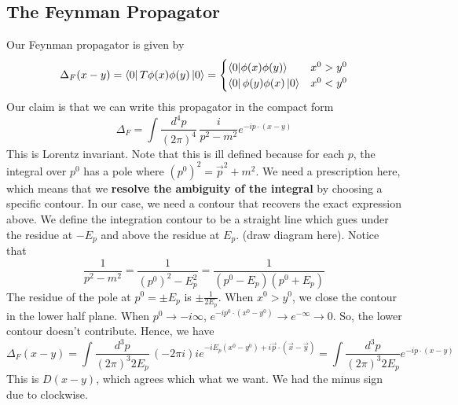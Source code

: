 \documentclass[11pt, oneside]{article}   	%
\theoremstyle{newline}
\theoremstyle{newline}
\theoremstyle{newline}
\theoremstyle{newline}
\theoremstyle{newline}
\begin{document}
\subsection{The Feynman Propagator} 
Our Feynman propagator is given by 
\[
\Delta_F( x - y )  = \bra{0}T \phi ( x) \phi( y ) \ket{0}  = \begin{cases}
\braket{0}{\phi ( x) \phi( y )} & x^{ 0 } > y^ 0 \\
\bra{0}\phi(y)\phi(x)\ket{0} & x^ 0 < y^0  
\end{cases}
\] Our claim is that we can write this propagator in the compact form 
\[
\Delta_F = \int \frac{d^4 p }{( 2 \pi )^4 } \, \frac{i }{p^2  - m^2 }e^{  - i p \cdot  ( x - y ) }
\] This is Lorentz invariant. Note that this is ill defined 
because for each $p $, the integral over $p^0 $ has 
a pole where $ ( p^0 )^2 = \vec{p}^2 + m^2 $. We need a prescription here, which means that we \textbf{resolve the ambiguity of the integral} by choosing a specific contour. 
In our case, we need a contour that recovers the exact expression above. 
We define the integration contour to be a straight line which gues under the residue at $ - E_p$ and above the residue at $ E_ p $.  
(draw diagram here). Notice that 
\[
\frac{1}{ p^2  - m^2 } = \frac{1}{ ( p^0)^ 2 - E_p^2}  = \frac{1}{( p^0 - E_p )(p^0 + E_p ) }
\] The residue of the pole at $ p^0 = \pm E_p $ is $ \pm \frac{1}{2 E_p}$. 
When $ x^ 0 > y ^0 $, we close the contour in the 
lower half plane. When $ p^0 \to  - i \infty $, $e^{  -i p^0 \cdot ( x^ 0 - y ^ 0 )} \to e^{  - \infty} \to 0 $. So, the lower contour doesn't 
contribute.  Hence, we have
\[
\Delta_F ( x - y )  = \int \frac{d^ 3 p }{ ( 2 \pi )^3 2 E_p } \, ( -  2  \pi i ) i e^{ - i E_p ( x^ 0 - y ^0 ) + i \vec{p} \cdot  ( \vec{x} - \vec{y} ) } = \int \frac{d^3 p }{ ( 2 \pi )^3 2 E_p } e^{  - i p \cdot  ( x -y ) }
\] This is $ D( x -y ) $, which agrees which what we want. We had the minus sign due to clockwise. 
\end{document}
